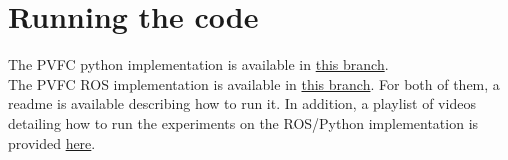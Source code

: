 \section{Running the code}
The PVFC python implementation is available in \href{https://github.com/bsbretly/pvfc_sim/tree/devel-beta_error}{this branch}.\\
The PVFC ROS implementation is available in \href{https://github.com/bsbretly/pvfc_ws/tree/jonas-pcl}{this branch}.
For both of them, a readme is available describing how to run it. 
In addition, a playlist of videos detailing how to run the experiments on the ROS/Python implementation is provided \href{https://www.youtube.com/watch?v=tSBsaKx5Zww&list=PLvZGCthLI9WrbS7W-F28ljQfRyHxxw-9p}{here}.